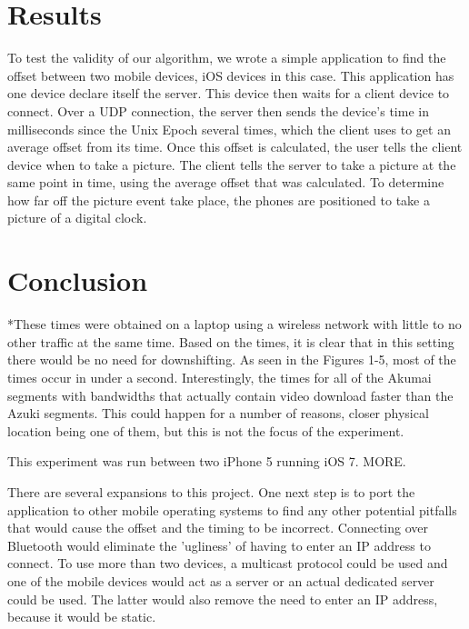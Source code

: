 \documentclass[10pt]{IEEEtran}
\begin{document}
\section{Results}

To test the validity of our algorithm, we wrote a simple application to find 
the offset between two mobile devices, iOS devices in this case. This
application has one device declare itself the server. This device then waits for
a client device to connect. Over a UDP connection, the server then sends the
device's time in milliseconds since the Unix Epoch several times, which the
client uses to get an average offset from its time. Once this offset is
calculated, the user tells the client device when to take a picture. The client
tells the server to take a picture at the same point in time, using the average
offset that was calculated. To determine how far off the picture event take
place, the phones are positioned to take a picture of a digital clock.



\section{Conclusion}

*These times were obtained on a laptop using a wireless network with little to 
no other traffic at the same time. Based on the times, it is clear that in this
setting there would be no need for downshifting. As seen in the Figures 1-5,
most of the times occur in under a second. Interestingly, the times for all of 
the Akumai segments with bandwidths that actually contain video download faster 
than the Azuki segments. This could happen for a number of reasons, closer 
physical location being one of them, but this is not the focus of the 
experiment.

This experiment was run between two iPhone 5 running iOS 7. MORE.

There are several expansions to this project. One next step is to port the 
application to other mobile operating systems to find any other potential 
pitfalls that would cause the offset and the timing to be incorrect. Connecting
over Bluetooth would eliminate the 'ugliness' of having to enter an IP address
to connect. To use more than two devices, a multicast protocol could be used and
one of the mobile devices would act as a server or an actual dedicated server
could be used. The latter would also remove the need to enter an IP address,
because it would be static. 
\end{document}
